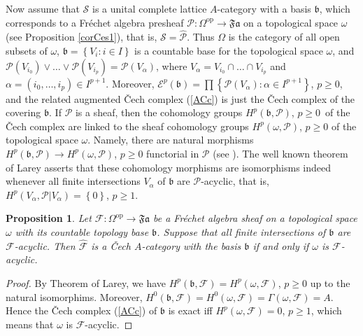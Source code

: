 \documentclass[12pt]{amsart}%
\theoremstyle{plain}
\newtheorem{proposition}{Proposition}
\numberwithin{equation}{section}
\numberwithin{equation}{section}
\numberwithin{theorem}{section}
\numberwithin{lemma}{section}
\numberwithin{remark}{section}
\numberwithin{example}{section}
\numberwithin{proposition}{section}
\numberwithin{definition}{section}
\numberwithin{corollary}{section}
\begin{document}
Now assume that $\mathcal{S}$ is a unital complete lattice $A$-category with a
basis $\mathfrak{b}$, which corresponds to a Fr\'{e}chet algebra presheaf
$\mathcal{P}:\Omega^{\operatorname{op}}\rightarrow\mathfrak{Fa}$ on a
topological space $\omega$ (see Proposition \ref{corCes1}), that is,
$\mathcal{S}=\widehat{\mathcal{P}}$. Thus $\Omega$ is the category of all open
subsets of $\omega$, $\mathfrak{b}=\left\{  V_{i}:i\in I\right\}  $ is a
countable base for the topological space $\omega$, and $\mathcal{P}\left(
V_{i_{0}}\right)  \vee\ldots\vee\mathcal{P}\left(  V_{i_{p}}\right)
=\mathcal{P}\left(  V_{\alpha}\right)  $, where $V_{\alpha}=V_{i_{0}}%
\cap\ldots\cap V_{i_{p}}$ and $\alpha=\left(  i_{0},\ldots,i_{p}\right)  \in
I^{p+1}$. Moreover, $\mathcal{E}^{p}\left(  \mathfrak{b}\right)
=\prod\left\{  \mathcal{P}\left(  V_{\alpha}\right)  :\alpha\in I^{p+1}%
\right\}  $, $p\geq0$, and the related augmented \v{C}ech complex (\ref{ACc})
is just the \v{C}ech complex of the covering $\mathfrak{b}$. If $\mathcal{P}$
is a sheaf, then the cohomology groups $H^{p}\left(  \mathfrak{b}%
,\mathcal{P}\right)  $, $p\geq0$\ of the \v{C}ech complex are linked to the
sheaf cohomology groups $H^{p}\left(  \omega,\mathcal{P}\right)  $, $p\geq0$
of the topological space $\omega$. Namely, there are natural morphisms
$H^{p}\left(  \mathfrak{b},\mathcal{P}\right)  \rightarrow H^{p}\left(
\omega,\mathcal{P}\right)  $, $p\geq0$ functorial in $\mathcal{P}$ (see
\cite[4.4.4]{Harts}). The well known theorem of Larey \cite[Exercise
4.4.11]{Harts} asserts that these cohomology morphisms are isomorphisms indeed
whenever all finite intersections $V_{\alpha}$ of $\mathfrak{b}$ are
$\mathcal{P}$-acyclic, that is, $H^{p}\left(  V_{\alpha},\mathcal{P}%
|V_{\alpha}\right)  =\left\{  0\right\}  $, $p\geq1$.

\begin{proposition}
\label{propAcyclic}Let $\mathcal{F}:\Omega^{\operatorname{op}}\rightarrow
\mathfrak{Fa}$ be a Fr\'{e}chet algebra sheaf on a topological space $\omega$
with its countable topology base $\mathfrak{b}$. Suppose that all finite
intersections of $\mathfrak{b}$ are $\mathcal{F}$-acyclic. Then
$\widehat{\mathcal{F}}$ is \textit{a \v{C}ech }$A$-\textit{category} with the
basis $\mathfrak{b}$ if and only if $\omega$ is $\mathcal{F}$-acyclic.
\end{proposition}

\begin{proof}
By Theorem of Larey, we have $H^{p}\left(  \mathfrak{b},\mathcal{F}\right)
=H^{p}\left(  \omega,\mathcal{F}\right)  $, $p\geq0$ up to the natural
isomorphims. Moreover, $H^{0}\left(  \mathfrak{b},\mathcal{F}\right)
=H^{0}\left(  \omega,\mathcal{F}\right)  =\Gamma\left(  \omega,\mathcal{F}%
\right)  =A$. Hence the \v{C}ech complex (\ref{ACc}) of $\mathfrak{b}$ is
exact iff $H^{p}\left(  \omega,\mathcal{F}\right)  =0$, $p\geq1$, which means
that $\omega$ is $\mathcal{F}$-acyclic.
\end{proof}
\end{document}
